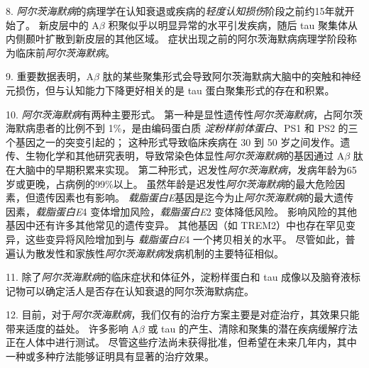 8. \textit{阿尔茨海默病}的病理学在认知衰退或疾病的\textit{轻度认知损伤}阶段之前约15年就开始了。
新皮层中的 A$\beta$ 积聚似乎以明显异常的水平引发疾病，随后 tau 聚集体从内侧颞叶扩散到新皮层的其他区域。
症状出现之前的阿尔茨海默病病理学阶段称为临床前\textit{阿尔茨海默病}。


9. 重要数据表明，A$\beta$ 肽的某些聚集形式会导致阿尔茨海默病大脑中的突触和神经元损伤，但与认知能力下降更好相关的是 tau 蛋白聚集形式的存在和积累。


10. \textit{阿尔茨海默病}有两种主要形式。
第一种是显性遗传性\textit{阿尔茨海默病}，占阿尔茨海默病患者的比例不到 1\%，是由编码蛋白质 \textit{淀粉样前体蛋白}、PS1 和 PS2 的三个基因之一的突变引起的；
这种形式导致临床疾病在 30 到 50 岁之间发作。遗传、生物化学和其他研究表明，导致常染色体显性\textit{阿尔茨海默病}的基因通过 A$\beta$ 肽在大脑中的早期积累来实现。
第二种形式，迟发性\textit{阿尔茨海默病}，发病年龄为65岁或更晚，占病例的99\%以上。
虽然年龄是迟发性\textit{阿尔茨海默病}的最大危险因素，但遗传因素也有影响。 \textit{载脂蛋白E}基因是迄今为止\textit{阿尔茨海默病}的最大遗传因素，\textit{载脂蛋白E}4 变体增加风险，\textit{载脂蛋白E}2 变体降低风险。
影响风险的其他基因中还有许多其他常见的遗传变异。
其他基因（如 TREM2）中也存在罕见变异，这些变异将风险增加到与 \textit{载脂蛋白E}4 一个拷贝相关的水平。
尽管如此，普遍认为散发性和家族性\textit{阿尔茨海默病}发病机制的主要特征相似。


11. 除了\textit{阿尔茨海默病}的临床症状和体征外，淀粉样蛋白和 tau 成像以及脑脊液标记物可以确定活人是否存在认知衰退的阿尔茨海默病症。


12. 目前，对于\textit{阿尔茨海默病}，我们仅有的治疗方案主要是对症治疗，其效果只能带来适度的益处。
许多影响 A$\beta$ 或 tau 的产生、清除和聚集的潜在疾病缓解疗法正在人体中进行测试。
尽管这些疗法尚未获得批准，但希望在未来几年内，其中一种或多种疗法能够证明具有显著的治疗效果。



